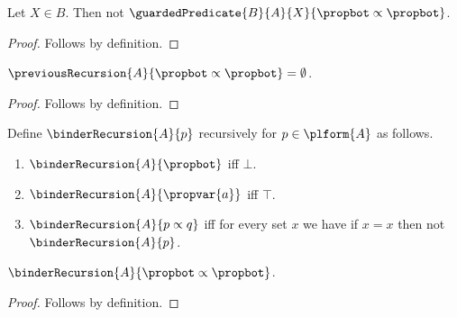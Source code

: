 \begin{proposition}\label{guarded_predicate_use}
    Let $X\in B$.
    Then not $\guardedPredicate{B}{A}{X}{\propbot\propto\propbot}$.
\end{proposition}
\begin{proof}
    Follows by definition.
\end{proof}

\begin{proposition}\label{previous_recursion_use}
    $\previousRecursion{A}{\propbot\propto\propbot}=\emptyset$.
\end{proposition}
\begin{proof}
    Follows by definition.
\end{proof}

\begin{recursive-definition}\label{binder_recursion}
    Define $\binderRecursion{A}{p}$ recursively for $p\in\plform{A}$ as follows.
    \begin{enumerate}
        \item[Falsity] $\binderRecursion{A}{\propbot}$ iff $\bot$.
        \item[Atom] $\binderRecursion{A}{\propvar{a}}$ iff $\top$.
        \item[Implication] $\binderRecursion{A}{p\propto q}$ iff
            for every set $x$ we have if $x=x$ then not $\binderRecursion{A}{p}$.
    \end{enumerate}
\end{recursive-definition}

\begin{proposition}\label{binder_recursion_use}
    $\binderRecursion{A}{\propbot\propto\propbot}$.
\end{proposition}
\begin{proof}
    Follows by definition.
\end{proof}
